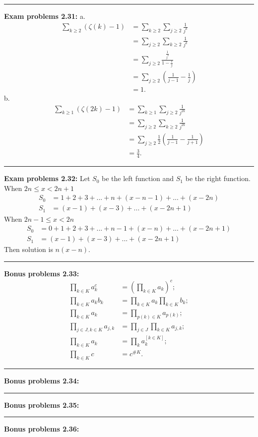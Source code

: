 \documentclass{article}
\begin{document}
\noindent\rule{\textwidth}{0.4pt}
\textbf{Exam problems 2.31:}
a.
\begin{align}
\sum_{k \ge 2} (\zeta(k)-1) &= \sum_{k \ge 2} \sum_{j \ge 2} \frac{1}{j^k} \\
			    &= \sum_{j \ge 2} \sum_{k \ge 2} \frac{1}{j^k}  \\
			    &= \sum_{j \ge 2} \frac{\frac{1}{j^2}}{1 - \frac{1}{j}} \\
			    &= \sum_{j \ge 2} (\frac{1}{j-1} - \frac{1}{j}) \\
			    &= 1.
\end{align}
b.
\begin{align}
\sum_{k \ge 1} (\zeta(2k)-1) &= \sum_{k \ge 1} \sum_{j \ge 2} \frac{1}{j^{2k}} \\
			    &= \sum_{j \ge 2} \sum_{k \ge 2} \frac{1}{j^{2k}}  \\
			    &= \sum_{j \ge 2} \frac{1}{2}(\frac{1}{j-1} - \frac{1}{j+1}) \\
			    &= \frac{3}{4}.
\end{align}

\noindent\rule{\textwidth}{0.4pt}
\textbf{Exam problems 2.32:}
Let $S_0$ be the left function and $S_1$ be the right function.
When $2n \le x < 2n + 1$
\begin{align}
S_0 &= 1 + 2 + 3 + ... + n + (x-n-1) + ... + (x - 2n) \\
S_1 &= (x-1) + (x-3) + ... + (x - 2n + 1)
\end{align}
When $2n-1 \le x < 2n$
\begin{align}
S_0 &= 0 + 1 + 2 + 3 + ... + n-1 + (x-n) + ... + (x - 2n + 1) \\
S_1 &= (x-1) + (x-3) + ... + (x - 2n + 1)
\end{align}
Then solution is $n(x-n)$.

\noindent\rule{\textwidth}{0.4pt}
\textbf{Bonus problems 2.33:}
\begin{align}
\prod_{k \in K}a_k^c &= (\prod_{k \in K}a_k)^c; \\
\prod_{k \in K}a_k b_k &= \prod_{k \in K}a_k \prod_{k \in K}b_k; \\
\prod_{k \in K}a_k &= \prod_{p(k) \in K}a_{p(k)}; \\
\prod_{j \in J,k\in K} a_{j,k} &= \prod_{j \in J} \prod_{k \in K} a_{j,k}; \\
\prod_{k \in K}a_k &= \prod_k a_k^{[k \in K]};\\
\prod_{k \in K} c &= c^{\#K}.
\end{align}

\noindent\rule{\textwidth}{0.4pt}
\textbf{Bonus problems 2.34:}

\noindent\rule{\textwidth}{0.4pt}
\textbf{Bonus problems 2.35:}

\noindent\rule{\textwidth}{0.4pt}
\textbf{Bonus problems 2.36:}
\end{document}
